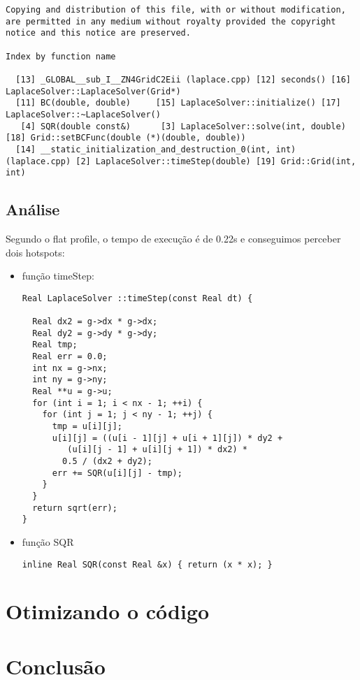 \documentclass[a4paper,twosidep]{article}
\begin{document}
\begin{verbatim}
Copying and distribution of this file, with or without modification,
are permitted in any medium without royalty provided the copyright
notice and this notice are preserved.

Index by function name

  [13] _GLOBAL__sub_I__ZN4GridC2Eii (laplace.cpp) [12] seconds() [16] LaplaceSolver::LaplaceSolver(Grid*)
  [11] BC(double, double)     [15] LaplaceSolver::initialize() [17] LaplaceSolver::~LaplaceSolver()
   [4] SQR(double const&)      [3] LaplaceSolver::solve(int, double) [18] Grid::setBCFunc(double (*)(double, double))
  [14] __static_initialization_and_destruction_0(int, int) (laplace.cpp) [2] LaplaceSolver::timeStep(double) [19] Grid::Grid(int, int)
\end{verbatim}

\subsection{Análise}
\label{sec:org85444c2}
Segundo o flat profile, o tempo de execução é de 0.22s e conseguimos perceber dois hotspots:
\begin{itemize}
\item função timeStep:
\begin{verbatim}
Real LaplaceSolver ::timeStep(const Real dt) {

  Real dx2 = g->dx * g->dx;
  Real dy2 = g->dy * g->dy;
  Real tmp;
  Real err = 0.0;
  int nx = g->nx;
  int ny = g->ny;
  Real **u = g->u;
  for (int i = 1; i < nx - 1; ++i) {
    for (int j = 1; j < ny - 1; ++j) {
      tmp = u[i][j];
      u[i][j] = ((u[i - 1][j] + u[i + 1][j]) * dy2 +
		 (u[i][j - 1] + u[i][j + 1]) * dx2) *
		0.5 / (dx2 + dy2);
      err += SQR(u[i][j] - tmp);
    }
  }
  return sqrt(err);
}
\end{verbatim}
\item função SQR
\begin{verbatim}
inline Real SQR(const Real &x) { return (x * x); }
\end{verbatim}
\end{itemize}


\section{Otimizando o código}
\label{sec:org832901b}

\section{Conclusão}
\label{sec:org4a19653}
\end{document}
